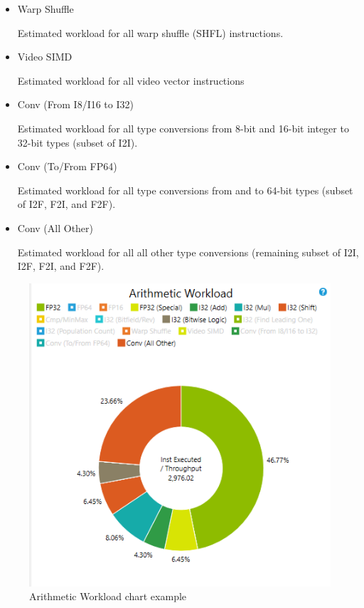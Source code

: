 \documentclass[oneside,openright,12pt,final,en]{mgr}
\begin{document}
\begin{itemize}
\begin{itemize}
		\item Warp Shuffle
		
		Estimated workload for all warp shuffle (SHFL) instructions.
		
		\item Video SIMD 
		
		Estimated workload for all video vector instructions
		
		\item Conv (From I8/I16 to I32)
		
		Estimated workload for all type conversions from 8-bit and 16-bit integer to 32-bit types (subset of I2I).
		
		\item Conv (To/From FP64) 
		
		Estimated workload for all type conversions from and to 64-bit types (subset of I2F, F2I, and F2F).
		
		\item Conv (All Other) 
		
		Estimated workload for all all other type conversions (remaining subset of I2I, I2F, F2I, and F2F).
		
	\end{itemize}
	
	\begin{figure}[H]
		\centering
		\includegraphics{PipeUtilization_ArithmeticWorkload}
		\caption{Arithmetic Workload chart example}
	\end{figure}
		
\end{itemize}
\end{document}
